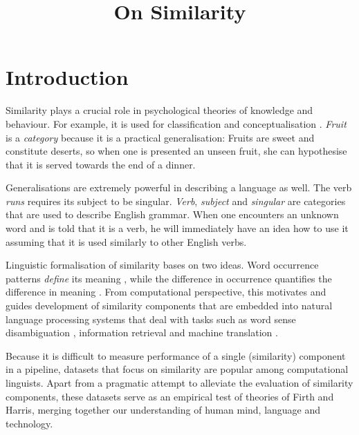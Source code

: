 \documentclass[11pt]{article}
\title{On Similarity}
\date{}
\begin{document}
\maketitle

\begin{abstract}

\end{abstract}

\section{Introduction}
\label{sec:introduction}

Similarity plays a crucial role in psychological theories of knowledge and behaviour. For example, it is used for classification and conceptualisation \cite{Tversky1977}. \textit{Fruit} is a \emph{category} because it is a practical generalisation: Fruits are sweet and constitute deserts, so when one is presented an unseen fruit, she can hypothesise that it is served towards the end of a dinner.

Generalisations are extremely powerful in describing a language as well. The verb \textit{runs} requires its subject to be singular. \textit{Verb}, \textit{subject} and \textit{singular} are categories that are used to describe English grammar. When one encounters an unknown word and is told that it is a verb, he will immediately have an idea how to use it assuming that it is used similarly to other English verbs.

Linguistic formalisation of similarity bases on two ideas. Word occurrence patterns \emph{define} its meaning \cite{firth1957lingtheory}, while the difference in occurrence \textup{quantifies} the difference in meaning \cite{harris1954distributional}. From computational perspective, this motivates and guides development of similarity components that are embedded into natural language processing systems that deal with tasks such as word sense disambiguation \cite{Schutze:1998:AWS:972719.972724}, information retrieval \cite{Salton:1975:VSM:361219.361220} and machine translation \cite{Dagan:1993:CWS:981574.981596}.

Because it is difficult to measure performance of a single (similarity) component in a pipeline, datasets that focus on similarity are popular among computational linguists. Apart from a pragmatic attempt to alleviate the evaluation of similarity components, these datasets serve as an empirical test of theories of Firth and Harris, merging together our understanding of human mind, language and technology.
\end{document}
